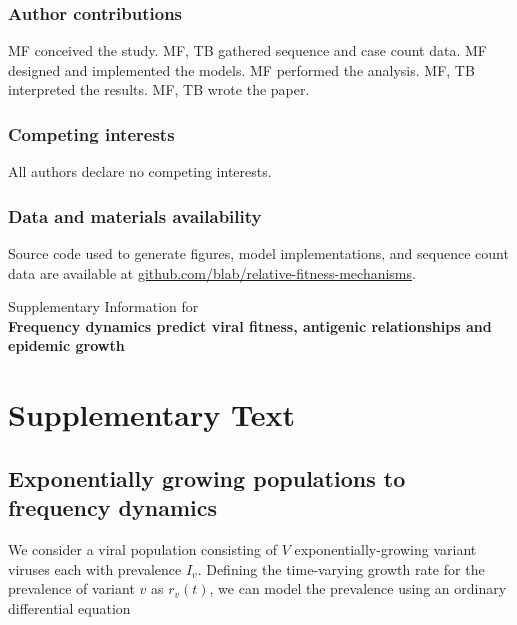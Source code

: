 \documentclass[11pt,oneside,letterpaper]{article}
\begin{document}
\subsubsection*{Author contributions}
MF conceived the study.
MF, TB gathered sequence and case count data.
MF designed and implemented the models.
MF performed the analysis.
MF, TB interpreted the results.
MF, TB wrote the paper.

\subsubsection*{Competing interests}

All authors declare no competing interests.

\subsubsection*{Data and materials availability}

Source code used to generate figures, model implementations, and sequence count data are available at \href{https://github.com/blab/relative-fitness-mechanisms}{github.com/blab/relative-fitness-mechanisms}.




\newpage

\appendix

\setcounter{figure}{0}
\setcounter{table}{0}
\setcounter{page}{1}
\renewcommand{\thefigure}{S\arabic{figure}}
\renewcommand{\thetable}{S\arabic{table}}
\renewcommand{\thepage}{S\arabic{page}}
\renewcommand{\thesubsection}{S\arabic{subsection}}

\begin{center}\Large
Supplementary Information for \\
\bf Frequency dynamics predict viral fitness, antigenic relationships and epidemic growth
\end{center}


\section*{Supplementary Text}

\subsection{Exponentially growing populations to frequency dynamics}\label{ssec:frequency_dynamics}

We consider a viral population consisting of $V$ exponentially-growing variant viruses each with prevalence $I_{v}$.
Defining the time-varying growth rate for the prevalence of variant $v$ as $r_{v}(t)$, we can model the prevalence using an ordinary differential equation
\end{document}
